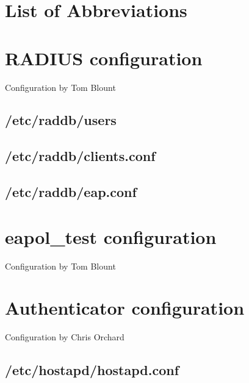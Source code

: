 \section{List of Abbreviations}
\renewcommand{\nomname}{}
\printnomenclature

\section{RADIUS configuration}
\label{sec:Code;sub:radius}
Configuration by Tom Blount
\subsection{/etc/raddb/users}



\subsection{/etc/raddb/clients.conf}



\subsection{/etc/raddb/eap.conf}



\section{eapol\_test configuration}
Configuration by Tom Blount


\section{Authenticator configuration}
\label{sec:Code;sub:authenticator}
Configuration by Chris Orchard
\subsection{/etc/hostapd/hostapd.conf}
